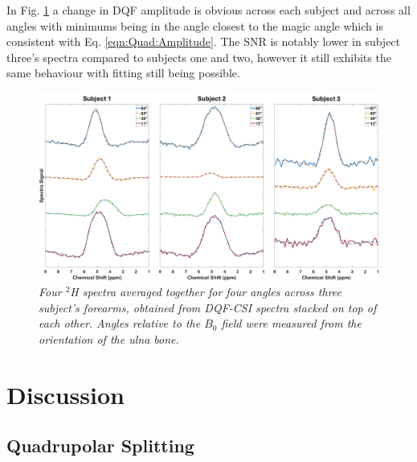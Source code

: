 In Fig. \ref{fig:Quad:DQF_CSI_Angle} a change in \ac{DQF} amplitude is obvious across each subject and across all angles with minimums being in the angle closest to the magic angle which is consistent with Eq. \ref{eqn:Quad:Amplitude}. The \ac{SNR} is notably lower in subject three's spectra compared to subjects one and two, however it still exhibits the same behaviour with fitting still being possible.

\begin{figure}
    \centering
    \includegraphics[width=1\textwidth]{Figures/Quad/DQF_CSI_Angle.png}
    \caption{\textit{Four $^2$H spectra averaged together for four angles across three subject's forearms, obtained from \ac{DQF}-\ac{CSI} spectra stacked on top of each other. Angles relative to the $B_0$ field were measured from the orientation of the ulna bone.}}
    \label{fig:Quad:DQF_CSI_Angle}
\end{figure}

\section{Discussion}

\subsection{Quadrupolar Splitting}

